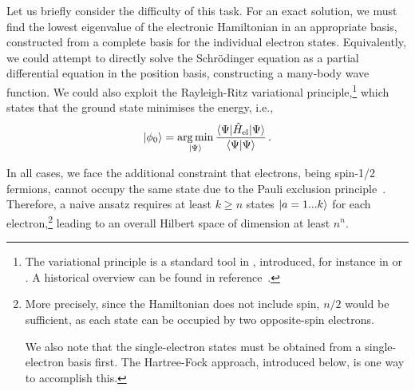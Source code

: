 Let us briefly consider the difficulty of this task. For an exact solution, we must find the lowest eigenvalue of the electronic Hamiltonian in an appropriate basis, constructed from a complete basis for the individual electron states. Equivalently, we could attempt to directly solve the Schrödinger equation as a partial differential equation in the position basis, constructing a many-body wave function.
We could also exploit the Rayleigh-Ritz variational principle,\footnote[][-1\baselineskip]{The variational principle is a standard tool in \qm, introduced, for instance in \cite[ch.~5.4]{sakurai2011} or \cite[ch.~1.3]{szabo1989}. A historical overview can be found in reference~\cite{gw2012p}.} which states that the ground state minimises the energy, i.e.,
\begin{equation}
	\label{eq:qm-min}
	\ket{\phi_0} = \argmin_{\ket{\Psi}} \frac{\braket{\Psi|\Hel|\Psi}}{\braket{\Psi | \Psi}} \, .
\end{equation}


In all cases, we face the additional constraint that electrons, being spin-1/2 fermions, cannot occupy the same state due to the Pauli exclusion principle~\cite{p1940p}.
Therefore, a naive ansatz requires at least $k \geq n$ states $\ket{a=1...k}$ for each electron,\footnote{More precisely, since the Hamiltonian does not include spin, $n/2$ would be sufficient, as each state can be occupied by two opposite-spin electrons.

We also note that the single-electron states must be obtained from a single-electron basis first. The Hartree-Fock approach, introduced below, is one way to accomplish this.
} leading to an overall Hilbert space of dimension at least $n^n$.

